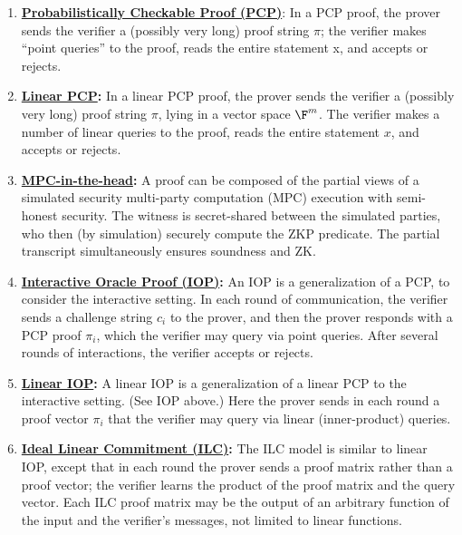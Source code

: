 	\begin{enumerate}[label=\alph*.]
  
	\item{}
	\textbf{\hyperref[paradigms:IT:PCP]{Probabilistically Checkable Proof (PCP)}}: 
	In a PCP proof, the prover sends the verifier a (possibly very long) proof string $\pi$; the verifier makes ``point queries'' to the proof, reads the entire statement x, and accepts or rejects. 
  
	\item{} 
	\textbf{\hyperref[paradigms:IT:linear-PCP]{Linear PCP}:} 
	In a linear PCP proof, the prover sends the verifier a (possibly very long) proof string $\pi$, lying in a vector space $\F^m$. 
	The verifier makes a number of linear queries to the proof, reads the entire statement $x$, and accepts or rejects. 
	\loosen
  
    \item{}
    \textbf{\hyperref[paradigms:IT:MPC-in-the-head]{MPC-in-the-head}:}
    A proof can be composed of the partial views of a simulated security multi-party computation (MPC) execution with semi-honest security.
    The witness is secret-shared between the simulated parties, who then (by simulation) securely compute the ZKP predicate.
    The partial transcript simultaneously ensures soundness and ZK.\loosen
  
	\item{} 
	\textbf{\hyperref[paradigms:IT:IOP]{Interactive Oracle Proof (IOP)}:} 
	An IOP is a generalization of a PCP, to consider the interactive setting. 
	In each round of communication, the verifier sends a challenge string $c_i$ to the prover, and then the prover responds with a PCP proof $\pi_i$, which the verifier may query via point queries.
	After several rounds of interactions, the verifier accepts or rejects.

  
	\item{} 
	\textbf{\hyperref[paradigms:IT:linear-IOP]{Linear IOP}:} 
	A linear IOP is a generalization of a linear PCP to the interactive setting. (See IOP above.) 
	Here the prover sends in each round a proof vector $\pi_i$ that the verifier may query via linear (inner-product) queries.
  
	\item{} 
	\textbf{\hyperref[paradigms:IT:ILC]{Ideal Linear Commitment (ILC)}:} 
	The ILC model is similar to linear IOP, except that in each round the prover sends a proof matrix rather than a proof vector; the verifier learns the product of the proof matrix and the query vector. 
	Each ILC proof matrix may be the output of an arbitrary function of the input and the verifier's messages, not limited to linear functions.

	\end{enumerate}


